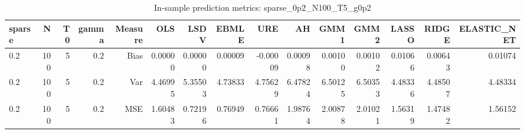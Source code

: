 \begin{table}[!htbp]\centering
\caption{In-sample prediction metrics: sparse_0p2_N100_T5_g0p2}
\label{tab:table2_sparse_0p2_N100_T5_g0p2}
\begin{tabular}{lrrrrrrrrrrrrrr}
\hline
sparse & N & T0 & gamma & Measure & OLS & LSDV & EBMLE & URE & AH & GMM1 & GMM2 & LASSO & RIDGE & ELASTIC_NET \\
\hline
0.2 & 100 & 5 & 0.2 & Bias & 0.00000 & 0.00000 & 0.00009 & -0.00009 & 0.00098 & 0.00100 & 0.00102 & 0.01066 & 0.00643 & 0.01074 \\
0.2 & 100 & 5 & 0.2 & Var & 4.46995 & 5.35503 & 4.73833 & 4.75629 & 6.47824 & 6.50125 & 6.50353 & 4.48336 & 4.48507 & 4.48334 \\
0.2 & 100 & 5 & 0.2 & MSE & 1.60483 & 0.72196 & 0.76949 & 0.76661 & 1.98764 & 2.00878 & 2.01021 & 1.56319 & 1.47482 & 1.56152 \\
\hline
\end{tabular}
\end{table}

